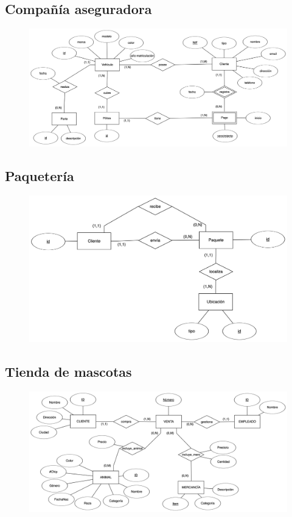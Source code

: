 \documentclass{db-practice}
\begin{document}
\subsection{Compañía aseguradora}
\begin{figure}[H]
    \centering
    \includegraphics[width=\textwidth]{figs/modelado/ejercicio-1}
\end{figure}

\subsection{Paquetería}
\begin{figure}[H]
    \centering
    \includegraphics[width=\textwidth]{figs/modelado/ejercicio-2}
\end{figure}

\subsection{Tienda de mascotas}
\begin{figure}[H]
    \centering
    \includegraphics[width=\textwidth]{figs/modelado/ejercicio-3}
\end{figure}
\end{document}
